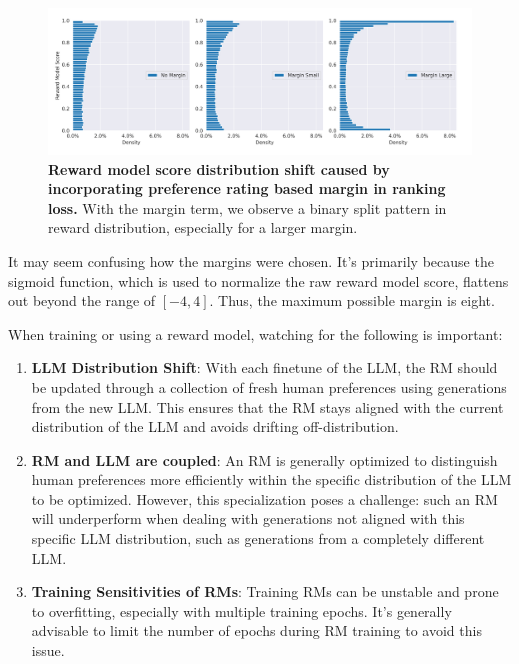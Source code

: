 \documentclass[
  letterpaper,
  DIV=11,
  numbers=noendperiod,
  oneside]{scrreprt}
\theoremstyle{remark}
\begin{document}
\begin{figure}

{\centering \includegraphics{Figures/margin-2.png}

}

\caption{\textbf{Reward model score distribution shift caused by
incorporating preference rating based margin in ranking loss.} With the
margin term, we observe a binary split pattern in reward distribution,
especially for a larger margin.}

\end{figure}%

It may seem confusing how the margins were chosen. It's primarily
because the sigmoid function, which is used to normalize the raw reward
model score, flattens out beyond the range of \([-4, 4]\). Thus, the
maximum possible margin is eight.

When training or using a reward model, watching for the following is
important:

\begin{enumerate}
\def\labelenumi{\arabic{enumi}.}
\item
  \textbf{LLM Distribution Shift}: With each finetune of the LLM, the RM
  should be updated through a collection of fresh human preferences
  using generations from the new LLM. This ensures that the RM stays
  aligned with the current distribution of the LLM and avoids drifting
  off-distribution.
\item
  \textbf{RM and LLM are coupled}: An RM is generally optimized to
  distinguish human preferences more efficiently within the specific
  distribution of the LLM to be optimized. However, this specialization
  poses a challenge: such an RM will underperform when dealing with
  generations not aligned with this specific LLM distribution, such as
  generations from a completely different LLM.
\item
  \textbf{Training Sensitivities of RMs}: Training RMs can be unstable
  and prone to overfitting, especially with multiple training epochs.
  It's generally advisable to limit the number of epochs during RM
  training to avoid this issue.
\end{enumerate}
\end{document}
